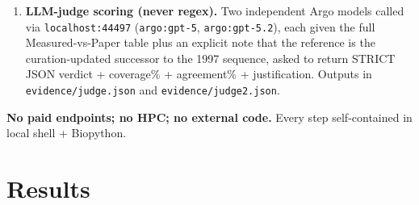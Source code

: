\documentclass[11pt,letterpaper]{article}
\begin{document}
\begin{enumerate}[nosep, leftmargin=1.4em]
\item \textbf{LLM-judge scoring (never regex).} Two independent Argo models called via
\texttt{localhost:44497} (\texttt{argo:gpt-5}, \texttt{argo:gpt-5.2}), each given the full
Measured-vs-Paper table plus an explicit note that the reference is the curation-updated successor
to the 1997 sequence, asked to return STRICT JSON verdict + coverage\% + agreement\% +
justification. Outputs in \texttt{evidence/judge.json} and \texttt{evidence/judge2.json}.
\end{enumerate}

\textbf{No paid endpoints; no HPC; no external code.} Every step self-contained in local shell + Biopython.

\section{Results}
\end{document}
